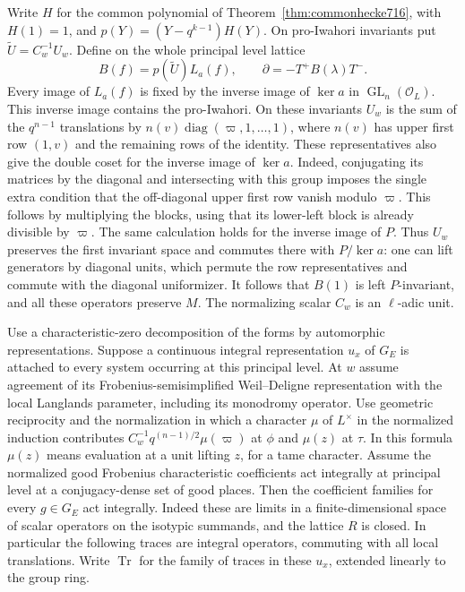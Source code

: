 \documentclass[a4paper,11pt]{article}
\theoremstyle{definition}
\theoremstyle{remark}
\numberwithin{equation}{section}
\newcommand{\GL}{\operatorname{GL}}
\begin{document}
Write \(H\) for the common polynomial of
Theorem~\ref{thm:commonhecke716}, with \(H(1)=1\), and
\(p(Y)=(Y-q^{k-1})H(Y)\). On pro-Iwahori invariants put
\(\widetilde U=C_w^{-1}U_w\). Define on the whole principal
level lattice
\[
            B(f)=p(\widetilde U)L_a(f),\qquad
            \partial=-T^+B(\lambda)T^-.
\]
Every image of \(L_a(f)\) is fixed by the inverse image of
\(\ker a\) in \(\GL_n(\mathcal O_L)\). This inverse image
contains the pro-Iwahori. On these invariants \(U_w\) is the sum
of the \(q^{n-1}\) translations by
\(n(v)\operatorname{diag}(\varpi,1,\ldots,1)\), where \(n(v)\)
has upper first row \((1,v)\) and the remaining rows of the
identity. These representatives also give the double coset for
the inverse image of \(\ker a\). Indeed, conjugating its
matrices by the diagonal and intersecting with this group
imposes the single extra condition that the off-diagonal
upper first row vanish modulo \(\varpi\). This follows by
multiplying the blocks, using that its lower-left block is
already divisible by \(\varpi\). The same calculation holds
for the inverse image of \(P\). Thus \(U_w\) preserves the
first invariant space and commutes there with \(P/\ker a\):
one can lift generators by diagonal units, which permute the
row representatives and commute with the diagonal uniformizer.
It follows that \(B(1)\) is left \(P\)-invariant, and all these
operators preserve \(M\). The normalizing scalar \(C_w\) is
an \(\ell\)-adic unit.

Use a characteristic-zero decomposition of the forms by
automorphic representations. Suppose a continuous integral
representation \(u_x\) of \(G_E\) is attached to every system
occurring at this principal level. At \(w\) assume agreement of
its Frobenius-semisimplified Weil--Deligne representation with
the local Langlands parameter, including its monodromy operator.
Use geometric reciprocity and the normalization in which a
character \(\mu\) of \(L^\times\) in the normalized induction
contributes \(C_w^{-1}q^{(n-1)/2}\mu(\varpi)\) at \(\phi\)
and \(\mu(z)\) at \(\tau\). In this formula \(\mu(z)\) means
evaluation at a unit lifting \(z\), for a tame character.
Assume the normalized good Frobenius characteristic coefficients
act integrally at principal level at a conjugacy-dense set of
good places. Then the coefficient families for every \(g\in G_E\)
act integrally. Indeed these are limits in a finite-dimensional
space of scalar operators on the isotypic summands, and the
lattice \(R\) is closed. In particular the following traces are
integral operators, commuting with all local translations. Write
\(\operatorname{Tr}\) for the family of traces in these \(u_x\),
extended linearly to the group ring.
\end{document}
